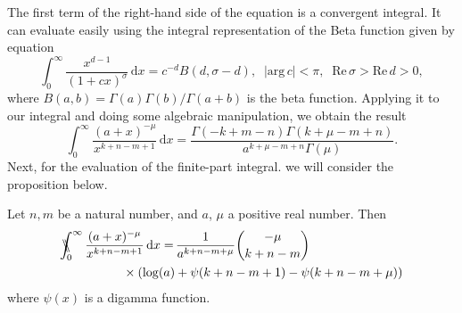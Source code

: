 The first term of the right-hand side of the equation is a convergent integral. It can evaluate easily using the integral representation of the Beta function given by equation
\begin{equation}
\int_0^{\infty} \frac{x^{d-1}}{(1+c x)^{\sigma}}\,\mathrm{d}x = c^{-d} B(d,\sigma-d),\;\; |\mathrm{arg}\,c|<\pi , \;\; \mathrm{Re}\, \sigma > \mathrm{Re}\, d>0,
\end{equation}
where $B(a,b)=\Gamma(a)\Gamma(b)/\Gamma(a+b)$ is the beta function. Applying it to our integral and doing some algebraic manipulation, we obtain the result
\begin{equation}
\int_0^{\infty} \frac{(a+x)^{-\mu}}{ x^{k+n-m+1}} \,\mathrm{d}x
= \frac{\Gamma (-k+m -n )  \Gamma (k+\mu -m +n )}{a^{k+\mu -m +n } \Gamma (\mu
   )}.
\label{BetaInt}
\end{equation}
Next, for the evaluation of the finite-part integral. we will consider the proposition below. 

\begin{proposition} \label{4.1}
Let $n, m$ be a natural number, and $a$, $\mu$ a positive real number. Then
\begin{equation}
\begin{split} \label{fp}
\bbint{0}{\infty} \frac{(a+x)^{-\mu}}{x^{k+n-m+1}}\,\mathrm{d}x = \, &\frac{1}{a^{k+n-m+\mu}} {-\mu \choose k+n-m} \\
& \hspace{-15mm} \times  \left(\log(a) + \psi(k+n-m+1) - \psi(k+n-m+\mu)\right)
\end{split}
\end{equation}
where $\psi(x)$ is a digamma function.
\end{proposition}

